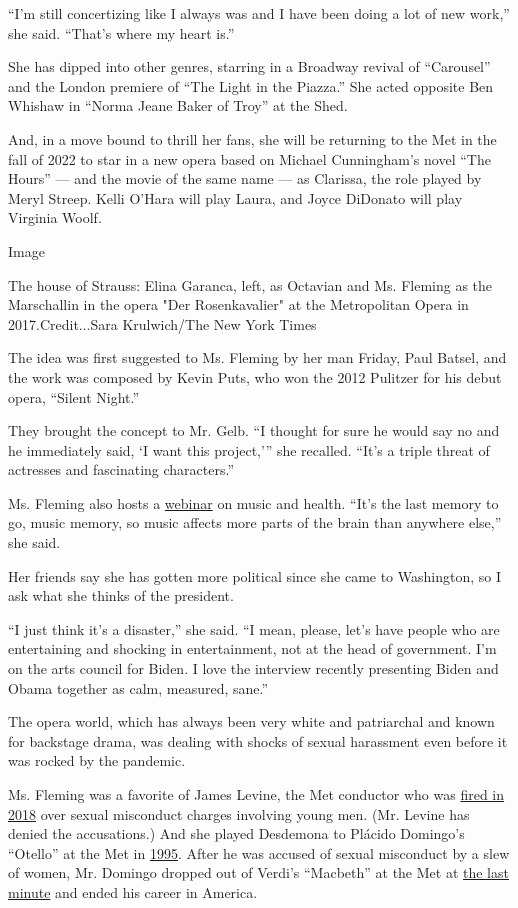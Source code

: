 ``I'm still concertizing like I always was and I have been doing a lot
of new work,'' she said. ``That's where my heart is.''

She has dipped into other genres, starring in a Broadway revival of
``Carousel'' and the London premiere of ``The Light in the Piazza.'' She
acted opposite Ben Whishaw in ``Norma Jeane Baker of Troy'' at the Shed.

And, in a move bound to thrill her fans, she will be returning to the
Met in the fall of 2022 to star in a new opera based on Michael
Cunningham's novel ``The Hours'' --- and the movie of the same name ---
as Clarissa, the role played by Meryl Streep. Kelli O'Hara will play
Laura, and Joyce DiDonato will play Virginia Woolf.

Image

The house of Strauss: Elina Garanca, left, as Octavian and Ms. Fleming
as the Marschallin in the opera "Der Rosenkavalier" at the Metropolitan
Opera in 2017.Credit...Sara Krulwich/The New York Times

The idea was first suggested to Ms. Fleming by her man Friday, Paul
Batsel, and the work was composed by Kevin Puts, who won the 2012
Pulitzer for his debut opera, ``Silent Night.''

They brought the concept to Mr. Gelb. ``I thought for sure he would say
no and he immediately said, `I want this project,''' she recalled.
``It's a triple threat of actresses and fascinating characters.''

Ms. Fleming also hosts a
\href{https://www.kennedy-center.org/whats-on/festivals-series/sound-health/music-and-the-mind/}{webinar}
on music and health. ``It's the last memory to go, music memory, so
music affects more parts of the brain than anywhere else,'' she said.

Her friends say she has gotten more political since she came to
Washington, so I ask what she thinks of the president.

``I just think it's a disaster,'' she said. ``I mean, please, let's have
people who are entertaining and shocking in entertainment, not at the
head of government. I'm on the arts council for Biden. I love the
interview recently presenting Biden and Obama together as calm,
measured, sane.''

The opera world, which has always been very white and patriarchal and
known for backstage drama, was dealing with shocks of sexual harassment
even before it was rocked by the pandemic.

Ms. Fleming was a favorite of James Levine, the Met conductor who was
\href{https://www.nytimes3xbfgragh.onion/2018/03/12/arts/music/james-levine-metropolitan-opera.html}{fired
in 2018} over sexual misconduct charges involving young men. (Mr. Levine
has denied the accusations.) And she played Desdemona to Plácido
Domingo's ``Otello'' at the Met in
\href{https://www.nytimes3xbfgragh.onion/1995/10/04/arts/opera-review-otello-outshines-all-the-accessories.html}{1995}.
After he was accused of sexual misconduct by a slew of women, Mr.
Domingo dropped out of Verdi's ``Macbeth'' at the Met at
\href{https://www.nytimes3xbfgragh.onion/2019/09/24/arts/music/placido-domingo-met-opera-harassment.html}{the
last minute} and ended his career in America.

